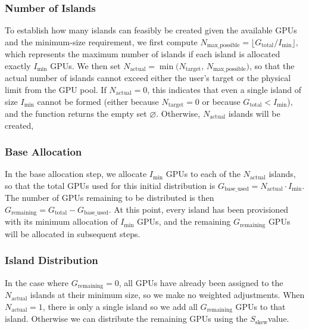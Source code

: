 \subsubsection{Number of Islands}

To establish how many islands can feasibly be created given the available GPUs and the minimum-size requirement, we first compute \(N_{\text{max\_possible}} = \lfloor G_{\text{total}} / I_{\text{min}} \rfloor\), which represents the maximum number of islands if each island is allocated exactly \(I_{\text{min}}\) GPUs.
We then set \(N_{\text{actual}} = \min\bigl(N_{\text{target}},\,N_{\text{max\_possible}}\bigr)\), so that the actual number of islands cannot exceed either the user's target or the physical limit from the GPU pool.
If \(N_{\text{actual}} = 0\), this indicates that even a single island of size \(I_{\text{min}}\) cannot be formed (either because \(N_{\text{target}} = 0\) or because \(G_{\text{total}} < I_{\text{min}}\)), and the function returns the empty set \(\varnothing\).
Otherwise, \(N_{\text{actual}}\) islands will be created,

\subsubsection{Base Allocation}

In the base allocation step, we allocate \(I_{\text{min}}\) GPUs to each of the \(N_{\text{actual}}\) islands, so that the total GPUs used for this initial distribution is \(G_{\text{base\_used}} = N_{\text{actual}} \cdot I_{\text{min}}\).
The number of GPUs remaining to be distributed is then \(G_{\text{remaining}} = G_{\text{total}} - G_{\text{base\_used}}\).
At this point, every island has been provisioned with its minimum allocation of \(I_{\text{min}}\) GPUs, and the remaining \(G_{\text{remaining}}\) GPUs will be allocated in subsequent steps.

\subsubsection{Island Distribution}

In the case where \(G_{\text{remaining}} = 0\), all GPUs have already been assigned to the \(N_{\text{actual}}\) islands at their minimum size, so we make no weighted adjustments.
When \(N_{\text{actual}} = 1\), there is only a single island so we add all \(G_{\text{remaining}}\) GPUs to that island.
Otherwise we can distribute the remaining GPUs using the \(S_{\text{skew}}\)value.


